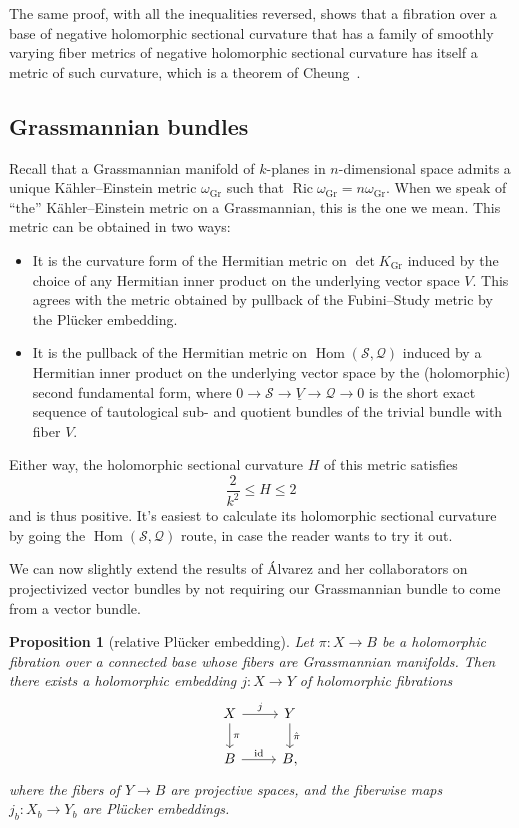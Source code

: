 \documentclass[10pt,a4paper]{amsart}
\newtheorem{prop}[theo]{Proposition}
\theoremstyle{definition}
\newcommand{\cc}[1]{\mathcal{#1}}
\DeclareMathOperator{\Ric}{Ric}
\DeclareMathOperator{\Gr}{Gr}
\DeclareMathOperator{\Hom}{Hom}
\DeclareMathOperator{\id}{id}
\def\kahler{K\"ahler}
\def\kahlerEinstein{\kahler--Einstein}
\begin{document}
The same proof, with all the inequalities reversed, shows that a fibration over
a base of negative holomorphic sectional curvature that has a family of
smoothly varying fiber metrics of negative holomorphic sectional curvature has
itself a metric of such curvature, which is a theorem of Cheung~\cite{cheung}.




\subsection*{Grassmannian bundles}



Recall that a Grassmannian manifold of $k$-planes in $n$-dimensional space
admits a unique \kahlerEinstein{} metric $\omega_{\Gr}$ such that
$\Ric \omega_{\Gr} = n \omega_{\Gr}$.
When we speak of ``the'' \kahlerEinstein{} metric on a Grassmannian, this is the one we mean.
This metric can be obtained in two ways:

\begin{itemize}
  \item It is the curvature form of the Hermitian metric on $\det K_{\Gr}$ induced by the choice of any Hermitian inner product on the underlying vector space $V$. This agrees with the metric obtained by pullback of the Fubini--Study metric by the Pl\"ucker embedding.

  \item It is the pullback of the Hermitian metric on $\Hom(\cc S, \cc Q)$ induced by a Hermitian inner product on the underlying vector space by the (holomorphic) second fundamental form, where $0 \to \cc S \to \underline {V} \to \cc Q \to 0$ is the short exact sequence of tautological sub- and quotient bundles of the trivial bundle with fiber $V$.
\end{itemize}

Either way, the holomorphic sectional curvature $H$ of this metric satisfies
\[
  \frac{2}{k^{2}} \leq H \leq 2
\]
and is thus positive.
It's easiest to calculate its holomorphic sectional curvature by going the $\Hom(\cc S, \cc Q)$ route, in case the reader wants to try it out.

We can now slightly extend the results of \'Alvarez and her collaborators on projectivized vector bundles by not requiring our Grassmannian bundle to come from a vector bundle.







\begin{prop}[relative Pl\"ucker embedding]
Let $\pi : X \to B$ be a holomorphic fibration over a connected base whose fibers are Grassmannian manifolds.
Then there exists a holomorphic embedding $j : X \to Y$ of holomorphic fibrations
\[
\begin{tikzcd}
  X \ar[d,"\pi"] \ar[r,"j"] & Y \ar[d,"\hat\pi"]
  \\
  B \ar[r,"\id"] & B,
\end{tikzcd}
\]
where the fibers of $Y \to B$ are projective spaces, and the fiberwise maps $j_{b} : X_{b} \to Y_{b}$ are Pl\"ucker embeddings.
\end{prop}
\end{document}
